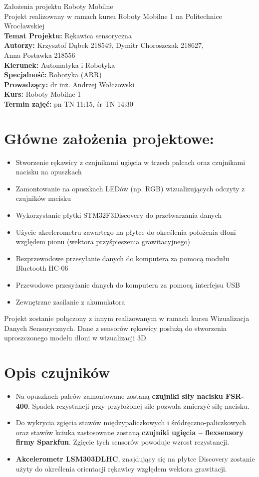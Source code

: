 \documentclass[12pt,a4paper]{article}
\begin{document}
\LARGE\centering Założenia projektu Roboty Mobilne\\
\large\centering Projekt realizowany w ramach kursu Roboty Mobilne 1 na Politechnice Wrocławskiej\\
\vspace{5 mm}
\normalsize\flushleft\textbf{Temat Projektu:} Rękawica sensoryczna\\
\textbf{Autorzy:} Krzysztof Dąbek 218549, Dymitr Choroszczak 218627,\\Anna Postawka 218556\\
\textbf{Kierunek:} Automatyka i Robotyka\\
\textbf{Specjalność:} Robotyka (ARR)\\
\textbf{Prowadzący:} dr inż. Andrzej Wołczowski\\
\textbf{Kurs:} Roboty Mobilne 1\\
\textbf{Termin zajęć:} pn TN 11:15, śr TN 14:30\\
\vspace{5 mm}
\section{Główne założenia projektowe: }\normalsize
\begin{itemize}
\item Stworzenie rękawicy z czujnikami ugięcia w trzech palcach oraz czujnikami nacisku na opuszkach
\item Zamontowanie na opuszkach LEDów (np. RGB) wizualizujących odczyty z czujników nacisku
\item Wykorzystanie płytki STM32F3Discovery do przetwarzania danych
\item Użycie akcelerometru zawartego na płytce do określenia położenia dłoni względem pionu (wektora przyśpieszenia grawitacyjnego)
\item Bezprzewodowe przesyłanie danych do komputera za pomocą modułu Bluetooth HC-06
\item Przewodowe przesyłanie danych do komputera za pomocą interfejsu USB
\item Zewnętrzne zasilanie z akumulatora
\end{itemize}
Projekt zostanie połączony z innym realizowanym w ramach kursu Wizualizacja Danych Sensorycznych. Dane z sensorów rękawicy posłużą do stworzenia uproszczonego modelu dłoni w wizualizacji 3D.
\section{Opis czujników}
\begin{itemize}
\item Na opuszkach palców zamontowane zostaną \textbf{czujniki siły nacisku FSR-400}. Spadek rezystancji przy przyłożonej sile pozwala zmierzyć siłę nacisku.
\item Do wykrycia zgięcia stawów międzypaliczkowych i śródręczno-paliczkowych oraz stawów kciuka zastosowane zostaną \textbf{czujniki ugięcia -- flexsensory firmy Sparkfun}. Zgięcie tych sensorów powoduje wzrost rezystancji.
\item \textbf{Akcelerometr LSM303DLHC}, znajdujący się na płytce Discovery zostanie użyty do określenia orientacji rękawicy względem wektora grawitacji.
\end{itemize}
\end{document}
